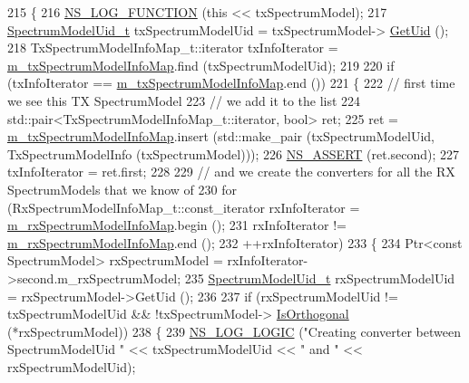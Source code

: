 \begin{DoxyCode}
215 \{
216   \hyperlink{log-macros-disabled_8h_a90b90d5bad1f39cb1b64923ea94c0761}{NS\_LOG\_FUNCTION} (\textcolor{keyword}{this} << txSpectrumModel);
217   \hyperlink{namespacens3_a5bf0e89b3407bbb59c90a4d8c4cf0a18}{SpectrumModelUid\_t} txSpectrumModelUid = txSpectrumModel->
      \hyperlink{classns3_1_1SpectrumModel_ae1d40eba0d8e7af10e954381b4380ac1}{GetUid} ();
218   TxSpectrumModelInfoMap\_t::iterator txInfoIterator = \hyperlink{classns3_1_1MultiModelSpectrumChannel_a401a74579865429a5008431e9000a8be}{m\_txSpectrumModelInfoMap}.find
       (txSpectrumModelUid);
219 
220   \textcolor{keywordflow}{if} (txInfoIterator == \hyperlink{classns3_1_1MultiModelSpectrumChannel_a401a74579865429a5008431e9000a8be}{m\_txSpectrumModelInfoMap}.end ())
221     \{
222       \textcolor{comment}{// first time we see this TX SpectrumModel}
223       \textcolor{comment}{// we add it to the list}
224       std::pair<TxSpectrumModelInfoMap\_t::iterator, bool> ret;
225       ret = \hyperlink{classns3_1_1MultiModelSpectrumChannel_a401a74579865429a5008431e9000a8be}{m\_txSpectrumModelInfoMap}.insert (std::make\_pair (txSpectrumModelUid, 
      TxSpectrumModelInfo (txSpectrumModel)));
226       \hyperlink{assert_8h_a6dccdb0de9b252f60088ce281c49d052}{NS\_ASSERT} (ret.second);
227       txInfoIterator = ret.first;
228 
229       \textcolor{comment}{// and we create the converters for all the RX SpectrumModels that we know of}
230       \textcolor{keywordflow}{for} (RxSpectrumModelInfoMap\_t::const\_iterator rxInfoIterator = 
      \hyperlink{classns3_1_1MultiModelSpectrumChannel_af75faef47b2e879fd82de7364ac2bcd0}{m\_rxSpectrumModelInfoMap}.begin ();
231            rxInfoIterator != \hyperlink{classns3_1_1MultiModelSpectrumChannel_af75faef47b2e879fd82de7364ac2bcd0}{m\_rxSpectrumModelInfoMap}.end ();
232            ++rxInfoIterator)
233         \{
234           Ptr<const SpectrumModel> rxSpectrumModel = rxInfoIterator->second.m\_rxSpectrumModel;
235           \hyperlink{namespacens3_a5bf0e89b3407bbb59c90a4d8c4cf0a18}{SpectrumModelUid\_t} rxSpectrumModelUid = rxSpectrumModel->GetUid ();
236 
237           \textcolor{keywordflow}{if} (rxSpectrumModelUid != txSpectrumModelUid && !txSpectrumModel->
      \hyperlink{classns3_1_1SpectrumModel_a7580b1e7e983b1862227e9ce37fccdab}{IsOrthogonal} (*rxSpectrumModel))
238             \{
239               \hyperlink{group__logging_ga88acd260151caf2db9c0fc84997f45ce}{NS\_LOG\_LOGIC} (\textcolor{stringliteral}{"Creating converter between SpectrumModelUid "} << 
      txSpectrumModelUid << \textcolor{stringliteral}{" and "} << rxSpectrumModelUid);

\end{DoxyCode}
